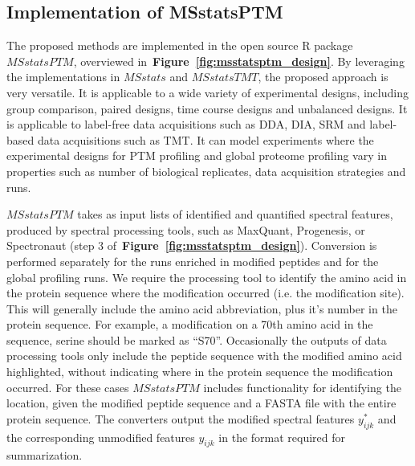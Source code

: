 \documentclass[mcp]{article}
\numberwithin{table}{section}
\def\figref#1{{\bf Figure~\ref{fig:#1}}}
\begin{document}
\subsection*{Implementation of MSstatsPTM}

The proposed methods are implemented in the open source R package $MSstatsPTM$, overviewed in~\figref{msstatsptm_design}. By leveraging the implementations in $MSstats$ and $MSstatsTMT$, the proposed approach is very versatile. It is applicable to a wide variety of experimental designs, including group comparison, paired designs, time course designs and unbalanced designs. It is applicable to label-free data acquisitions such as DDA, DIA, SRM and label-based data acquisitions such as TMT. It can model experiments where the experimental designs for PTM profiling and global proteome profiling vary in properties such as number of biological replicates, data acquisition strategies and runs. 

$MSstatsPTM$ takes as input lists of identified and quantified spectral features, produced by spectral processing tools, such as MaxQuant, Progenesis, or Spectronaut (step 3 of~\figref{msstatsptm_design}). Conversion is performed separately for the runs enriched in modified peptides and for the global profiling runs. We require the processing tool to identify the amino acid in the protein sequence where the modification occurred (i.e. the modification site). This will generally include the amino acid abbreviation, plus it's number in the protein sequence. For example, a modification on a 70th amino acid in the sequence, serine should be marked as ``S70''. Occasionally the outputs of data processing tools only include the peptide sequence with the modified amino acid highlighted, without indicating where in the protein sequence the modification occurred. For these cases $MSstatsPTM$ includes functionality for identifying the location, given the modified peptide sequence and a FASTA file with the entire protein sequence. The converters output the modified spectral features $y_{ijk}^{\ast}$ and the corresponding unmodified features $y_{ijk}$ in the format required for summarization.
\end{document}
